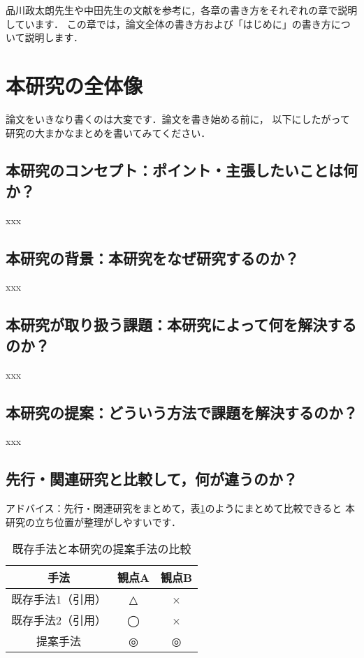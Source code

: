 品川政太朗先生や中田先生の文献を参考に，各章の書き方をそれぞれの章で説明しています．
この章では，論文全体の書き方および「はじめに」の書き方について説明します．

\section{本研究の全体像}
論文をいきなり書くのは大変です．論文を書き始める前に，
以下にしたがって研究の大まかなまとめを書いてみてください．

\subsection*{本研究のコンセプト：ポイント・主張したいことは何か？}
xxx

\subsection*{本研究の背景：本研究をなぜ研究するのか？}
xxx

\subsection*{本研究が取り扱う課題：本研究によって何を解決するのか？}
xxx

\subsection*{本研究の提案：どういう方法で課題を解決するのか？}
xxx

\subsection*{先行・関連研究と比較して，何が違うのか？}
アドバイス：先行・関連研究をまとめて，表\ref{tab:novelty}のようにまとめて比較できると
本研究の立ち位置が整理がしやすいです．

\begin{table}[tb]
    \centering
    \begin{tabular}{c|cc}
        \hline \hline
        手法 & 観点A & 観点B \\
        \hline
        既存手法1（引用） & △ & × \\
        既存手法2（引用） & ◯ & × \\
        提案手法 & ◎ & ◎ \\
        \hline 
    \end{tabular}
    \caption{既存手法と本研究の提案手法の比較}
    \label{tab:novelty}
\end{table}

